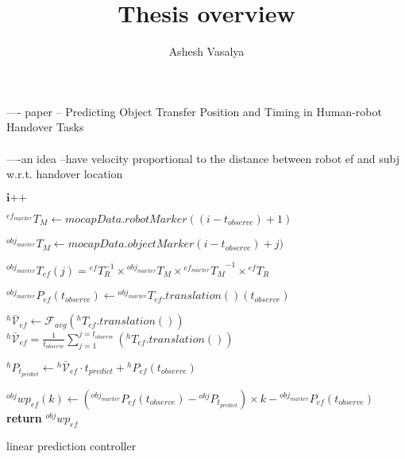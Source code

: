 \documentclass{article}
\title{Thesis overview}
\author{Ashesh Vasalya}
\begin{document}
\maketitle

---- paper -- Predicting Object Transfer Position and Timing in Human-robot Handover Tasks
\paragraph{}

----an idea --have velocity proportional to the distance between robot ef and subj w.r.t. handover location\newpage

\begin{algorithm}[H]
\DontPrintSemicolon

		
		
        \textit{$\textbf{i++}$} 
		 
		{
		 	$\mathcal{}^{ef_{marker}}{T}_M\gets \textit{mocapData}.robotMarker((i-t_{observe})+1)$
		

			{
			 	$\mathcal{}^{obj_{marker}}{T}_M\gets \textit{mocapData}.objectMarker(i-t_{observe})+j)$	
				
				$\mathcal{}^{obj_{marker}}{T}_{ef}(j) = \mathcal{}^{ef}{T}_R^{-1} \times  \mathcal{}^{obj_{marker}}{T}_M \times {\mathcal{}^{ef_{marker}}{T}_M}^{-1} \times  \mathcal{}^{ef}{T}_R$	
				
				{
					${}^{obj_{marker}}P_{ef}(t_{observe}) \gets \mathcal{}^{obj_{marker}}{T}_{ef}.translation()(t_{observe}) $
				}
			}
		
			${}^{h}\mathcal{\bar{V}}_{ef} \gets \mathcal{F}_{avg}(\mathcal{}^{h}{T}_{ef}.translation())$	\newline 
			${}^{h}\mathcal{\bar{V}}_{ef} = \frac{1}{t_{observe}}{\sum_{j=1}^{j=t_{observe}} (\mathcal{}^{h}{T}_{ef}.translation())}$	\newline 
		
		
		
			${}^{h}P_{t_{predict}} \gets {}^{h}\mathcal{\bar{V}}_{ef} \cdot t_{predict}  + {}^{h}P_{ef}(t_{observe})$ \newline %
			
			{
				{
					${}^{obj}wp_{ef}(k) \gets ( {}^{obj_{marker}}P_{ef}(t_{observe}) - {}^{obj}P_{t_{predict}}  ) \times k  -  {}^{obj_{marker}}P_{ef}(t_{observe}) $ 
				}	
				\textbf{return} $ {}^{obj}wp_{ef} $
			}
		}
\caption{linear prediction controller}
\end{algorithm}
\end{document}
